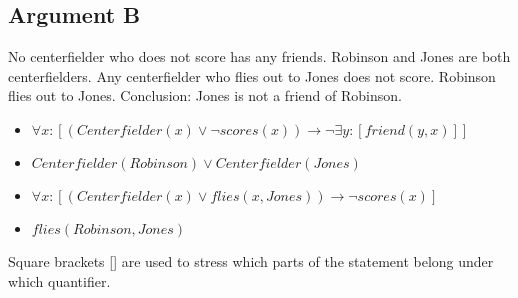 \subsection{Argument B}
\begin{large}
    No centerfielder who does not score has any friends. Robinson and Jones are both centerfielders. Any
    centerfielder who flies out to Jones does not score. Robinson flies out to Jones.
    Conclusion: Jones is not a friend of Robinson.
    \begin{itemize}
        \item $\forall x : [(Centerfielder(x) \lor \neg scores(x)) \rightarrow \neg \exists y : [friend(y, x)]]$
        \item $Centerfielder(Robinson) \lor Centerfielder(Jones)$
        \item $\forall x : [(Centerfielder(x) \lor flies(x, Jones)) \rightarrow \neg scores(x)]$
        \item $flies(Robinson, Jones)$
    \end{itemize}
    Square brackets [] are used to stress which parts of the statement belong under which quantifier.
\end{large}